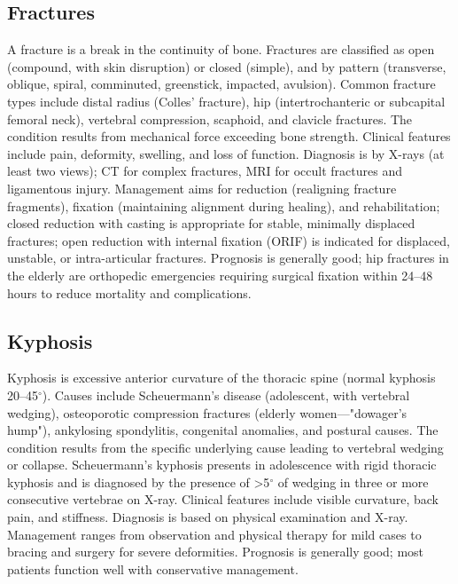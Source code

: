 \subsection{Fractures}
\label{sec:Fractures}
A fracture is a break in the continuity of bone. Fractures are classified as open (compound, with skin disruption) or closed (simple), and by pattern (transverse, oblique, spiral, comminuted, greenstick, impacted, avulsion). Common fracture types include distal radius (Colles' fracture), hip (intertrochanteric or subcapital femoral neck), vertebral compression, scaphoid, and clavicle fractures. The condition results from mechanical force exceeding bone strength. Clinical features include pain, deformity, swelling, and loss of function. Diagnosis is by X-rays (at least two views); CT for complex fractures, MRI for occult fractures and ligamentous injury. Management aims for reduction (realigning fracture fragments), fixation (maintaining alignment during healing), and rehabilitation; closed reduction with casting is appropriate for stable, minimally displaced fractures; open reduction with internal fixation (ORIF) is indicated for displaced, unstable, or intra-articular fractures. Prognosis is generally good; hip fractures in the elderly are orthopedic emergencies requiring surgical fixation within 24--48 hours to reduce mortality and complications.

\subsection{Kyphosis}
\label{sec:Kyphosis}
Kyphosis is excessive anterior curvature of the thoracic spine (normal kyphosis 20--45$^\circ$). Causes include Scheuermann's disease (adolescent, with vertebral wedging), osteoporotic compression fractures (elderly women---"dowager's hump"), ankylosing spondylitis, congenital anomalies, and postural causes. The condition results from the specific underlying cause leading to vertebral wedging or collapse. Scheuermann's kyphosis presents in adolescence with rigid thoracic kyphosis and is diagnosed by the presence of >5$^\circ$ of wedging in three or more consecutive vertebrae on X-ray. Clinical features include visible curvature, back pain, and stiffness. Diagnosis is based on physical examination and X-ray. Management ranges from observation and physical therapy for mild cases to bracing and surgery for severe deformities. Prognosis is generally good; most patients function well with conservative management.

